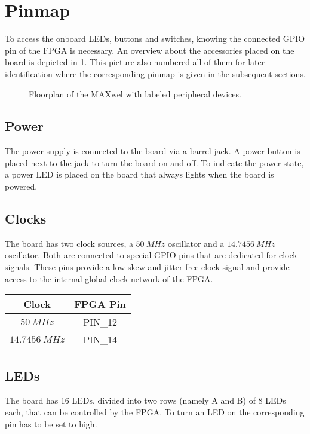 \section{Pinmap}

To access the onboard LEDs, buttons and switches, knowing the connected GPIO pin of the FPGA is necessary.
An overview about the accessories placed on the board is depicted in \cref{fig:floorplan_full}.
This picture also numbered all of them for later identification where the corresponding pinmap is given in the subsequent sections.

\begin{figure}[h!]
    \centering
    
    \caption{Floorplan of the MAXwel with labeled peripheral devices.}
    \label{fig:floorplan_full}
\end{figure}

\subsection{Power}
The power supply is connected to the board via a barrel jack.
A power button is placed next to the jack to turn the board on and off.
To indicate the power state, a power LED is placed on the board that always lights when the board is powered.

\subsection{Clocks}
The board has two clock sources, a $\SI{50}{MHz}$ oscillator and a $\SI{14,7456}{MHz}$ oscillator.
Both are connected to special GPIO pins that are dedicated for clock signals.
These pins provide a low skew and jitter free clock signal and provide access to the internal global clock network of the FPGA.

\begin{center}
	\begin{tabular}{c c}
		Clock & FPGA Pin \\
		\hline
		$\SI{50}{MHz}$ & PIN\_12 \\
		$\SI{14.7456}{MHz}$ & PIN\_14 \\
		\hline
	\end{tabular}
\end{center}

\subsection{LEDs}
The board has 16 LEDs, divided into two rows (namely A and B) of 8 LEDs each, that can be controlled by the FPGA.
To turn an LED on the corresponding pin has to be set to high.

